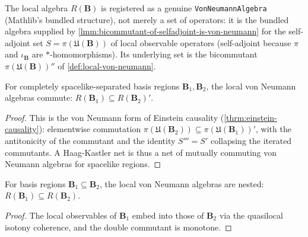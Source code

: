 \begin{definition}
    \label{def:local-von-neumann-algebra}
    \leanok
    The local algebra $R(\mathbf{B})$ is registered as a genuine \texttt{VonNeumannAlgebra} (Mathlib's bundled structure), not merely a set of operators: it is the bundled algebra supplied by \ref{lmm:bicommutant-of-selfadjoint-is-von-neumann} for the self-adjoint set $S = \pi(\mathfrak{U}(\mathbf{B}))$ of local observable operators (self-adjoint because $\pi$ and $\iota_{\mathbf{B}}$ are $*$-homomorphisms). Its underlying set is the bicommutant $\pi(\mathfrak{U}(\mathbf{B}))''$ of \ref{def:local-von-neumann}.
\end{definition}

\begin{theorem}
    \label{thrm:von-neumann-microcausality}
    \leanok
    For completely spacelike-separated basis regions $\mathbf{B}_1, \mathbf{B}_2$, the local von Neumann algebras commute: $R(\mathbf{B}_1) \subseteq R(\mathbf{B}_2)'$.
\end{theorem}
\begin{proof}
    \leanok
    This is the von Neumann form of Einstein causality (\ref{thrm:einstein-causality}): elementwise commutation $\pi(\mathfrak{U}(\mathbf{B}_2)) \subseteq \pi(\mathfrak{U}(\mathbf{B}_1))'$, with the antitonicity of the commutant and the identity $S''' = S'$ collapsing the iterated commutants. A Haag-Kastler net is thus a net of mutually commuting von Neumann algebras for spacelike regions.
\end{proof}

\begin{theorem}
    \label{thrm:von-neumann-isotony}
    \leanok
    For basis regions $\mathbf{B}_1 \subseteq \mathbf{B}_2$, the local von Neumann algebras are nested: $R(\mathbf{B}_1) \subseteq R(\mathbf{B}_2)$.
\end{theorem}
\begin{proof}
    \leanok
    The local observables of $\mathbf{B}_1$ embed into those of $\mathbf{B}_2$ via the quasilocal isotony coherence, and the double commutant is monotone.
\end{proof}

